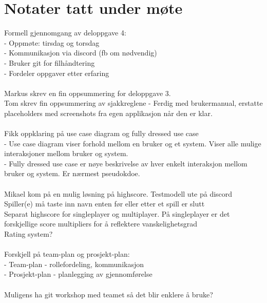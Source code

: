 \documentclass[letterpaper,11pt]{article}
\begin{document}
\section*{Notater tatt under møte}
Formell gjennomgang av deloppgave 4:\\
- Oppmøte: tirsdag og torsdag\\
- Kommunikasjon via discord (fb om nødvendig)\\
- Bruker git for filhåndtering\\
- Fordeler oppgaver etter erfaring\\\\
Markus skrev en fin oppsummering for deloppgave 3.\\
Tom skrev fin oppsummering av sjakkreglene - Ferdig med brukermanual, erstatte placeholders med screenshots fra egen applikasjon når den er klar.\\\\
Fikk oppklaring på use case diagram og fully dressed use case\\
- Use case diagram viser forhold mellom en bruker og et system. Viser alle mulige interaksjoner mellom bruker og system.\\
- Fully dressed use case er nøye beskrivelse av hver enkelt interaksjon mellom bruker og system. Er nærmest pseudokdoe.\\\\
Mikael kom på en mulig løsning på highscore. Testmodell ute på discord\\
Spiller(e) må taste inn navn enten før eller etter et spill er slutt\\
Separat highscore for singleplayer og multiplayer. På singleplayer er det forskjellige score multipliers for å reflektere vanskelighetsgrad\\
Rating system?\\\\
Forskjell på team-plan og prosjekt-plan:\\
- Team-plan - rollefordeling, kommunikasjon\\
- Prosjekt-plan - planlegging av gjennomførelse\\\\
Muligens ha git workshop med teamet så det blir enklere å bruke?
\end{document}
